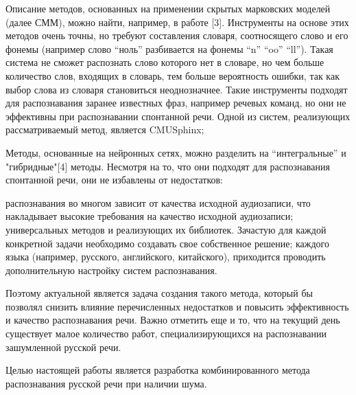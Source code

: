 \documentclass[conference]{IEEEtran}
\begin{document}
    Описание методов, основанных на применении скрытых марковских моделей (далее СММ), можно найти, например, в работе [3].
    Инструменты на основе этих методов очень точны, но требуют составления словаря, соотносящего слово и его фонемы (например слово “ноль” разбивается на фонемы “n” “oo” “ll”).
    Такая система не сможет распознать слово которого нет в словаре, но чем больше количество слов, входящих в словарь, тем больше вероятность ошибки, так как выбор слова из словаря становиться неоднозначнее.
    Такие инструменты подходят для распознавания заранее известных фраз, например речевых команд, но они не эффективны при распознавании спонтанной речи.
    Одной из систем, реализующих рассматриваемый метод, является CMUSphinx;

    Методы, основанные на нейронных сетях, можно разделить на “интегральные” и "гибридные"[4] методы.
    Несмотря на то, что они подходят для распознавания спонтанной речи, они не избавлены от недостатков:

    \begin{itemize}
         распознавания во многом зависит от качества исходной аудиозаписи, что накладывает высокие требования на качество исходной аудиозаписи;
         универсальных методов и реализующих их библиотек. Зачастую для каждой конкретной задачи необходимо создавать свое собственное решение;
         каждого языка (например, русского, английского, китайского), приходится проводить дополнительную настройку систем распознавания.
    \end{itemize}
    Поэтому актуальной является задача создания такого метода,
    который бы позволял снизить влияние перечисленных недостатков
    и повысить эффективность и качество распознавания речи.
    Важно отметить еще и то, что на текущий день существует малое количество работ,
    специализирующихся на распознавании зашумленной русской речи.

    Целью настоящей работы является разработка комбинированного метода распознавания русской речи при наличии шума.
\end{document}
